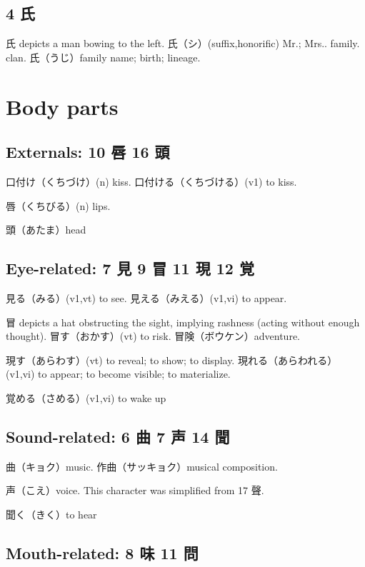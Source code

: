 \subsection{4 氏}

氏 depicts a man bowing to the left.
氏（シ）(suffix,honorific) Mr.; Mrs.. family. clan.
氏（うじ）family name; birth; lineage.

\section{Body parts}

\subsection{Externals: 10 唇 16 頭}

口付け（くちづけ）(n) kiss.
口付ける（くちづける）(v1) to kiss.

唇（くちびる）(n) lips.

頭（あたま）head

\subsection{Eye-related: 7 見 9 冒 11 現 12 覚}

見る（みる）(v1,vt) to see.
見える（みえる）(v1,vi) to appear.

冒 depicts a hat obstructing the sight, implying rashness
(acting without enough thought).
冒す（おかす）(vt) to risk.
冒険（ボウケン）adventure.

現す（あらわす）(vt) to reveal; to show; to display.
現れる（あらわれる）(v1,vi) to appear; to become visible; to materialize.

覚める（さめる）(v1,vi) to wake up

\subsection{Sound-related: 6 曲 7 声 14 聞}

曲（キョク）music.
作曲（サッキョク）musical composition.

声（こえ）voice.
This character was simplified from 17 聲.

聞く（きく）to hear

\subsection{Mouth-related: 8 味 11 問}

